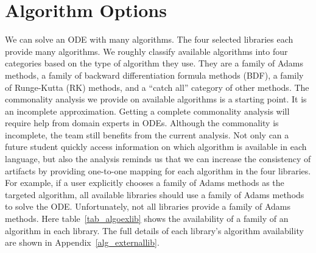 \section{Algorithm Options}
We can solve an ODE with many algorithms. The four selected libraries each provide many algorithms. We roughly classify available algorithms into four categories based on the type of algorithm they use. They are a family of Adams methods, a family of backward differentiation formula methods (BDF), a family of Runge-Kutta (RK) methods, and a ``catch all'' category of other methods. The commonality analysis we provide on available algorithms is a starting point. It is an incomplete approximation. Getting a complete commonality analysis will require help from domain experts in ODEs. Although the commonality is incomplete, the team still benefits from the current analysis. Not only can a future student quickly access information on which algorithm is available in each language, but also the analysis reminds us that we can increase the consistency of artifacts by providing one-to-one mapping for each algorithm in the four libraries. For example, if a user explicitly chooses a family of Adams methods as the targeted algorithm, all available libraries should use a family of Adams methods to solve the ODE. Unfortunately, not all libraries provide a family of Adams methods. Here table~\ref{tab_algoexlib} shows the availability of a family of an algorithm in each library. The full details of each library's algorithm availability are shown in Appendix~\ref{alg_externallib}.

